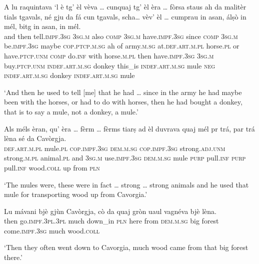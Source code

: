 \begin{linenumbers}
\gll A lu raquintava `l è tg’ èl vèva … cunquaj tg' èl èra … fòrsa staus ah da malitèr tials tgavals, né gju da fá cun tgavals, scha… vèv’ èl … cumprau in asan, álṣò in mél, bitg in asan, in mél.   \\
and then tell.\textsc{impf.3sg} \textsc{3sg.m} also \textsc{comp} \textsc{3sg.m} have.\textsc{impf.3sg} {} since \textsc{comp} \textsc{3sg.m} be.\textsc{impf.3sg} {} maybe \textsc{cop.ptcp.m.sg} ah  of army.\textsc{m.sg} at.\textsc{def.art.m.pl} horse.\textsc{pl} or have.\textsc{ptcp.unm}  \textsc{comp} do.\textsc{inf} with horse.\textsc{m.pl} then have.\textsc{impf.3sg} \textsc{3sg.m} {}  buy.\textsc{ptcp.unm}  \textsc{indef.art.m.sg} donkey this\_is \textsc{indef.art.m.sg} mule \textsc{neg} \textsc{indef.art.m.sg} donkey \textsc{indef.art.m.sg} mule \\
\end{linenumbers}
\medskip
\glt `And then he used to tell [me] that he had … since in the army he had maybe been with the horses, or had to do with horses, then he had bought a donkey, that is to say a mule, not a donkey, a mule.'
\medskip

\begin{linenumbers}
\gll Als méls èran, qu’ èra … fèrm … fèrms tiarṣ ad èl duvrava quaj mél pr trá, par trá lèna sé da Cavòrgja.   \\
 \textsc{def.art.m.pl} mule.\textsc{pl} \textsc{cop.impf.3sg} \textsc{dem.m.sg} \textsc{cop.impf.3sg} {} strong.\textsc{adj.unm} {} strong.\textsc{m.pl} animal.\textsc{pl} and \textsc{3sg.m} use.\textsc{impf.3sg} \textsc{dem.m.sg} mule \textsc{purp} pull.\textsc{inf} \textsc{purp} pull.\textsc{inf} wood.\textsc{coll} up from \textsc{pln}  \\
\end{linenumbers}
\medskip
\glt `The mules were, these were in fact … strong … strong animals and he used that mule for transporting wood up from Cavorgia.'
\medskip

\begin{linenumbers}
\gll  Lu mávani bjè gjùn Cavòrgja, cò da quaj gròn uaul\footnotemark{} vagnéva bjè lèna.\\
then go.\textsc{impf.3pl.3pl} much down\_in \textsc{pln} here from \textsc{dem.m.sg} big forest come.\textsc{impf.3sg} much wood.\textsc{coll}  \\
\end{linenumbers}
\medskip
\glt `Then they often went down to Cavorgia, much wood came from that big forest there.'
\medskip

